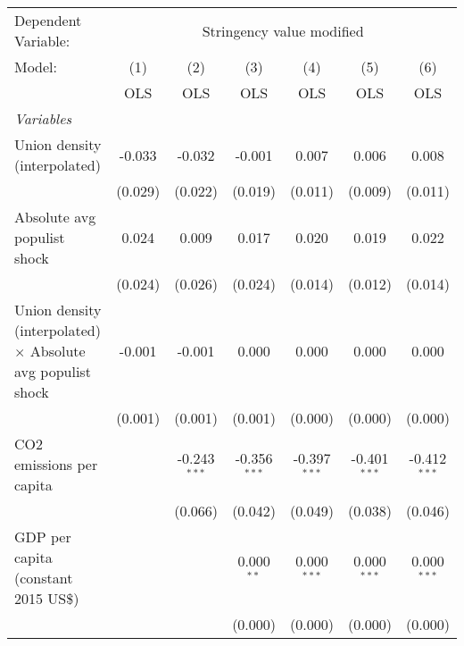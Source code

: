 
\begingroup
\centering
\begin{tabular}{lcccccc}
   \toprule
   Dependent Variable: & \multicolumn{6}{c}{Stringency value modified}\\
   Model:                                                             & (1)     & (2)            & (3)            & (4)            & (5)            & (6)\\  
                                                                      &  OLS    & OLS            & OLS            & OLS            & OLS            & OLS\\  
   \midrule
   \emph{Variables}\\
   Union density (interpolated)                                       & -0.033  & -0.032         & -0.001         & 0.007          & 0.006          & 0.008\\   
                                                                      & (0.029) & (0.022)        & (0.019)        & (0.011)        & (0.009)        & (0.011)\\   
   Absolute avg populist shock                                        & 0.024   & 0.009          & 0.017          & 0.020          & 0.019          & 0.022\\   
                                                                      & (0.024) & (0.026)        & (0.024)        & (0.014)        & (0.012)        & (0.014)\\   
   Union density (interpolated) $\times$ Absolute avg populist shock  & -0.001  & -0.001         & 0.000          & 0.000          & 0.000          & 0.000\\   
                                                                      & (0.001) & (0.001)        & (0.001)        & (0.000)        & (0.000)        & (0.000)\\   
   CO2 emissions per capita                                           &         & -0.243$^{***}$ & -0.356$^{***}$ & -0.397$^{***}$ & -0.401$^{***}$ & -0.412$^{***}$\\   
                                                                      &         & (0.066)        & (0.042)        & (0.049)        & (0.038)        & (0.046)\\   
   GDP per capita (constant 2015 US\$)                                &         &                & 0.000$^{**}$   & 0.000$^{***}$  & 0.000$^{***}$  & 0.000$^{***}$\\   
                                                                      &         &                & (0.000)        & (0.000)        & (0.000)        & (0.000)\\   

\end{tabular}
